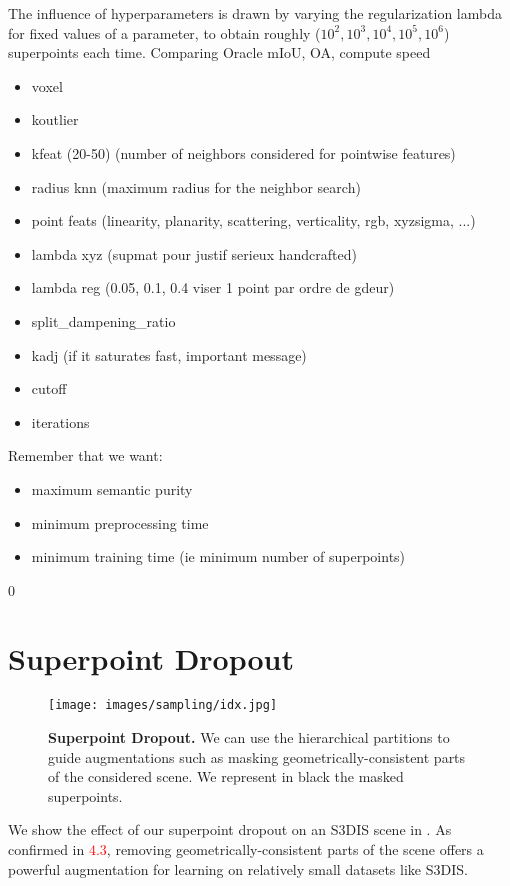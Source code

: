 The influence of hyperparameters is drawn by varying the regularization lambda for fixed values of a parameter, to obtain roughly ($10^2, 10^3, 10^4, 10^5, 10^6$) superpoints each time. Comparing Oracle mIoU, OA, compute speed 
\begin{itemize}
    \item voxel
    \item koutlier
    \item kfeat (20-50) (number of neighbors considered for pointwise features)
    \item radius knn (maximum radius for the neighbor search) 
    \item point feats (linearity, planarity, scattering, verticality, rgb, xyz\/sigma, ...)
    \item lambda xyz (supmat pour justif serieux handcrafted)
    \item lambda reg (0.05, 0.1, 0.4 viser 1 point par ordre de gdeur)
    \item split\_dampening\_ratio
    \item kadj (if it saturates fast, important message)
    \item cutoff 
    \item iterations
\end{itemize}

Remember that we want:
\begin{itemize}
    \item maximum semantic purity
    \item minimum preprocessing time
    \item minimum training time (ie minimum number of superpoints)
\end{itemize}
\fi 

 0
\section{Superpoint Dropout}
\label{sec:spdropout}

\begin{figure}
\centering
\texttt{[image: images/sampling/idx.jpg]}
\caption{{\bf Superpoint Dropout.} We can use the hierarchical partitions to guide augmentations such as masking geometrically-consistent parts of the considered scene. We represent in black the masked superpoints.}
\label{fig:dropout}
\end{figure} 

We show the effect of our superpoint dropout on an S3DIS scene in . As confirmed in \textcolor{red}{$4.3$}, removing geometrically-consistent parts of the scene offers a powerful augmentation for learning on relatively small datasets like S3DIS.

